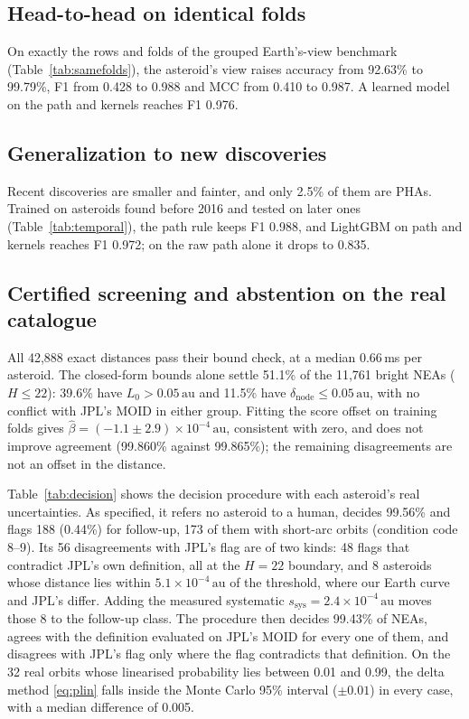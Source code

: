 \documentclass[conference]{IEEEtran}
\newcommand{\au}{\,\mathrm{au}}
\begin{document}
\subsection{Head-to-head on identical folds}
On exactly the rows and folds of the grouped Earth's-view benchmark (Table~\ref{tab:samefolds}), the asteroid's view raises accuracy from 92.63\% to 99.79\%, F1 from 0.428 to 0.988 and MCC from 0.410 to 0.987. A learned model on the path and kernels reaches F1 0.976.

\subsection{Generalization to new discoveries}
Recent discoveries are smaller and fainter, and only 2.5\% of them are PHAs. Trained on asteroids found before 2016 and tested on later ones (Table~\ref{tab:temporal}), the path rule keeps F1 0.988, and LightGBM on path and kernels reaches F1 0.972; on the raw path alone it drops to 0.835.



\subsection{Certified screening and abstention on the real catalogue}
All 42,888 exact distances pass their bound check, at a median 0.66\,ms per asteroid. The closed-form bounds alone settle 51.1\% of the 11,761 bright NEAs ($H \le 22$): 39.6\% have $L_0 > 0.05\au$ and 11.5\% have $\delta_{\mathrm{node}} \le 0.05\au$, with no conflict with JPL's MOID in either group. Fitting the score offset on training folds gives $\hat\beta = (-1.1 \pm 2.9)\times10^{-4}\au$, consistent with zero, and does not improve agreement (99.860\% against 99.865\%); the remaining disagreements are not an offset in the distance.



Table~\ref{tab:decision} shows the decision procedure with each asteroid's real uncertainties. As specified, it refers no asteroid to a human, decides 99.56\% and flags 188 (0.44\%) for follow-up, 173 of them with short-arc orbits (condition code 8--9). Its 56 disagreements with JPL's flag are of two kinds: 48 flags that contradict JPL's own definition, all at the $H = 22$ boundary, and 8 asteroids whose distance lies within $5.1\times10^{-4}\au$ of the threshold, where our Earth curve and JPL's differ. Adding the measured systematic $s_{\mathrm{sys}} = 2.4\times10^{-4}\au$ moves those 8 to the follow-up class. The procedure then decides 99.43\% of NEAs, agrees with the definition evaluated on JPL's MOID for every one of them, and disagrees with JPL's flag only where the flag contradicts that definition. On the 32 real orbits whose linearised probability lies between 0.01 and 0.99, the delta method \eqref{eq:plin} falls inside the Monte Carlo 95\% interval ($\pm0.01$) in every case, with a median difference of 0.005.
\end{document}
